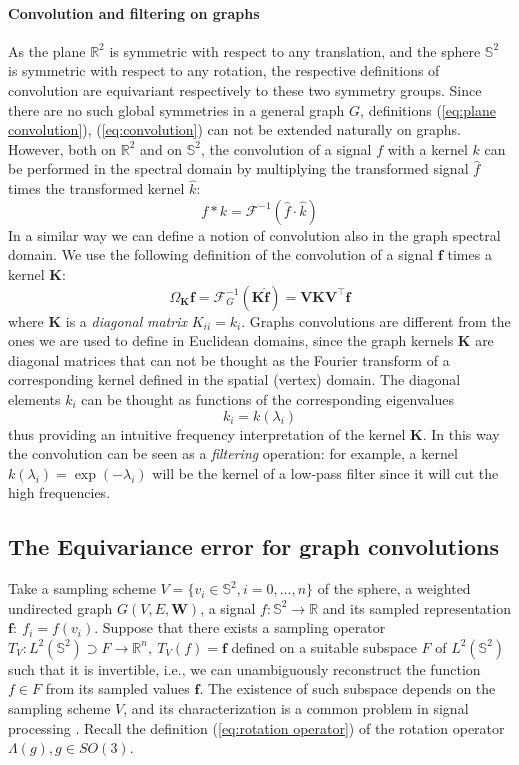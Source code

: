 \paragraph{Convolution and filtering on graphs}
 As the plane $\mathbb R^2$ is symmetric with respect to any translation, and the sphere $\mathbb S^2$ is symmetric with respect to any rotation, the respective definitions of convolution are equivariant respectively to these two symmetry groups. Since there are no such global symmetries in a general graph $G$, definitions (\ref{eq:plane convolution}), (\ref{eq:convolution}) can not be extended naturally on graphs. However, both on $\mathbb R^2$ and on $\mathbb S^2$, the convolution of a signal $f$ with a kernel $k$ can be performed in the spectral domain by multiplying the transformed signal $\hat f$ times the transformed kernel $\hat k$: 
\begin{equation}\label{eq:convolution normal}
f*k = \mathcal F^{-1}(\hat f \cdot \hat k)
\end{equation}
In a similar way we can define a notion of convolution also in the graph spectral domain. We use the following definition \cite{Vandergheynst} of the convolution of a signal $\mathbf f$ times a kernel $\mathbf K$:
\begin{equation}\label{eq:graph convolution}
	\Omega_\mathbf K\mathbf f = \mathcal{F}^{-1}_G(\mathbf K \hat {\mathbf f})= \mathbf V\mathbf K  \mathbf V^\intercal {\mathbf f}
\end{equation}
where $\mathbf K$ is a \textit{diagonal} \textit{matrix} $K_{ii} = k_i$. Graphs convolutions are different from the ones we are used to define in Euclidean domains, since the graph kernels $\mathbf K$ are diagonal matrices that can not be thought as the Fourier transform of a corresponding kernel defined in the spatial (vertex) domain. The diagonal elements $k_{i}$ can be thought as functions of the corresponding eigenvalues 
$$
k_{i}= k(\lambda_i)
$$
thus providing an intuitive frequency interpretation of the kernel $\mathbf K$. In this way the convolution can be seen as a \textit{filtering} operation: for example, a kernel $k(\lambda_i) = \exp (-\lambda_i)$ will be the kernel of a low-pass filter since it will cut the high frequencies.

\subsection{The Equivariance error for graph convolutions}
Take a sampling scheme $V=\{v_i\in\mathbb S^2, i=0, ..., n\}$ of the sphere, a weighted undirected graph $G(V, E, \mathbf W)$, a signal $f: \mathbb S^2\to\mathbb R$ and its sampled representation $\mathbf f:\ f_i=f(v_i)$. Suppose that there exists a sampling operator $T_V: L^2(\mathbb S^2) \supset F\to \mathbb R^n,\  T_V(f) = \mathbf f$ defined on a suitable subspace $F$ of $L^2(\mathbb S^2)$ such that it is invertible, i.e., we can unambiguously reconstruct the function $f\in F$ from its sampled values $\mathbf f$. The existence of such subspace depends on the sampling scheme $V$, and its characterization is a common problem in signal processing \cite{Driscoll:1994:CFT:184069.184073}. Recall the definition (\ref{eq:rotation operator}) of the rotation operator $\Lambda(g), g\in SO(3)$. 

